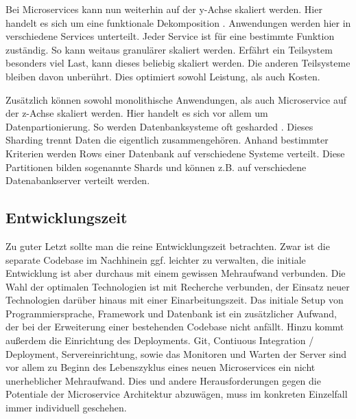 Bei Microservices kann nun weiterhin auf der y-Achse skaliert werden. Hier handelt es sich um eine funktionale Dekomposition \cite[][]{abbott2009art}. Anwendungen werden hier in verschiedene Services unterteilt. Jeder Service ist für eine bestimmte Funktion zuständig. So kann weitaus granulärer skaliert werden. Erfährt ein Teilsystem besonders viel Last, kann dieses beliebig skaliert werden. Die anderen Teilsysteme bleiben davon unberührt. Dies optimiert sowohl Leistung, als auch Kosten.

Zusätzlich können sowohl monolithische Anwendungen, als auch Microservice auf der z-Achse skaliert werden. Hier handelt es sich vor allem um Datenpartionierung. So werden Datenbanksysteme oft gesharded \cite[][]{microsoft:sharding}. Dieses Sharding trennt Daten die eigentlich zusammengehören. Anhand bestimmter Kriterien werden Rows einer Datenbank auf verschiedene Systeme verteilt. Diese Partitionen bilden sogenannte Shards und können z.B. auf verschiedene Datenabankserver verteilt werden.

\subsection{Entwicklungszeit}
Zu guter Letzt sollte man die reine Entwicklungszeit betrachten. Zwar ist die separate Codebase im Nachhinein ggf. leichter zu verwalten, die initiale Entwicklung ist aber durchaus mit einem gewissen Mehraufwand verbunden. Die Wahl der optimalen Technologien ist mit Recherche verbunden, der Einsatz neuer Technologien darüber hinaus mit einer Einarbeitungszeit. Das initiale Setup von Programmiersprache, Framework und Datenbank ist ein zusätzlicher Aufwand, der bei der Erweiterung einer bestehenden Codebase nicht anfällt. Hinzu kommt außerdem die Einrichtung des Deployments. Git, Contiuous Integration / Deployment, Servereinrichtung, sowie das Monitoren und Warten der Server sind vor allem zu Beginn des Lebenszyklus eines neuen Microservices ein nicht unerheblicher Mehraufwand. Dies und andere Herausforderungen gegen die Potentiale der Microservice Architektur abzuwägen, muss im konkreten Einzelfall immer individuell geschehen.

